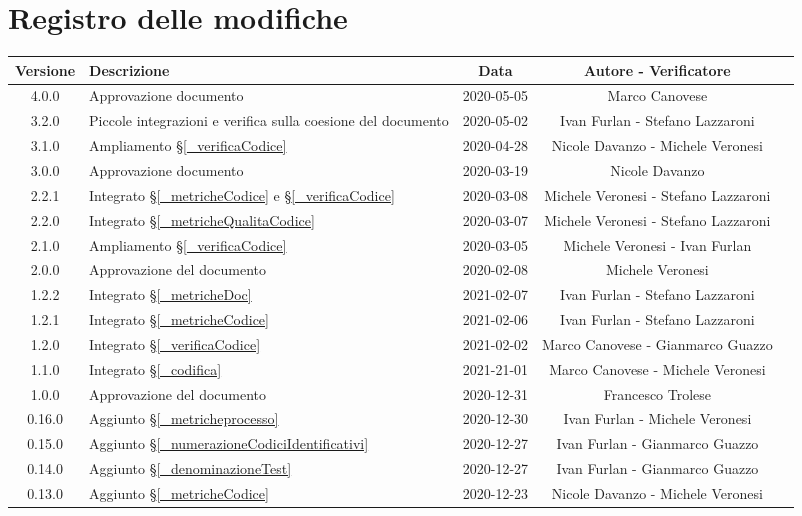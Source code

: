 \section*{Registro delle modifiche}

\begin{center}
	\begin{longtable}{|c|p{5cm}|c|c|c|}
		\hline
		\rowcolor{lighter-grayer}
		\textbf{Versione} & \textbf{Descrizione} & \textbf{Data} & \textbf{Autore - Verificatore} \\
		\hline
		\endfirsthead

		4.0.0 & Approvazione documento & 2020-05-05 & Marco Canovese \\
		3.2.0 & Piccole integrazioni e verifica sulla coesione del documento & 2020-05-02 & Ivan Furlan - Stefano Lazzaroni \\
		3.1.0 & Ampliamento \S\ref{_verificaCodice}  & 2020-04-28 & Nicole Davanzo - Michele Veronesi  \\
		3.0.0 & Approvazione documento & 2020-03-19 & Nicole Davanzo \\
		2.2.1 & Integrato \S\ref{_metricheCodice} e \S\ref{_verificaCodice}& 2020-03-08 & Michele Veronesi - Stefano Lazzaroni \\
		2.2.0 & Integrato \S\ref{_metricheQualitaCodice} & 2020-03-07 & Michele Veronesi - Stefano Lazzaroni \\
		2.1.0 & Ampliamento \S\ref{_verificaCodice}  & 2020-03-05 & Michele Veronesi - Ivan Furlan  \\
		2.0.0 & Approvazione del documento & 2020-02-08 & Michele Veronesi \\
		1.2.2 & Integrato \S\ref{_metricheDoc} & 2021-02-07 & Ivan Furlan - Stefano Lazzaroni \\
		1.2.1 & Integrato \S\ref{_metricheCodice} & 2021-02-06 & Ivan Furlan - Stefano Lazzaroni \\
		1.2.0 & Integrato \S\ref{_verificaCodice} & 2021-02-02 & Marco Canovese - Gianmarco Guazzo \\
		1.1.0 & Integrato \S\ref{_codifica} & 2021-21-01 & Marco Canovese - Michele Veronesi \\
		1.0.0 & Approvazione del documento & 2020-12-31 & Francesco Trolese \\
		0.16.0 & Aggiunto \S\ref{_metricheprocesso} & 2020-12-30 & Ivan Furlan - Michele Veronesi \\
		0.15.0 & Aggiunto \S\ref{_numerazioneCodiciIdentificativi} & 2020-12-27 & Ivan Furlan - Gianmarco Guazzo \\
		0.14.0 & Aggiunto \S\ref{_denominazioneTest} & 2020-12-27 & Ivan Furlan - Gianmarco Guazzo  \\
		0.13.0 & %
		Aggiunto \S\ref{_metricheCodice} & 2020-12-23 & Nicole Davanzo - Michele Veronesi  \\
		

\end{longtable}
\end{center}
